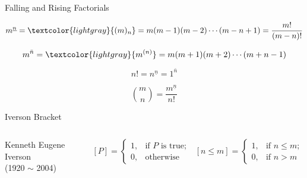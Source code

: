 
\begin{frame}{}
  \begin{center}
    Falling and Rising Factorials
  \end{center}

  \[
    m^{\underline{n}} = \textcolor{lightgray}{(m)_{n}} 
    = m (m-1) (m-2) \cdots (m-n+1) = \frac{m!}{(m-n)!}
  \]

  \pause
  \[
    m^{\bar{n}} = \textcolor{lightgray}{m^{(n)}} 
    = m (m+1) (m+2) \cdots (m+n-1) 
  \]

  \pause
  \[
    n! = n^{\underline{n}} = 1^{\bar{n}}
  \]

  \pause
  \[
    {m \choose n} = \frac{m^{\underline{n}}}{n!}
  \]
\end{frame}

\begin{frame}{}
  \begin{center}
    Iverson Bracket
  \end{center}

  \begin{columns}
      \begin{center}
        Kenneth Eugene Iverson \\ (1920 $\sim$ 2004)
      \end{center}
      \[
          [P] = \begin{cases}
                  1, & \text{if $P$ is true}; \\
                  0, & \text{otherwise}
              \end{cases}
      \]

      \pause
      \vspace{0.80cm}
      \[
          [n \le m] = \begin{cases}
                      1, & \text{if } n \le m; \\
                      0, & \text{if } n > m
                      \end{cases}
      \]
  \end{columns}
\end{frame}
